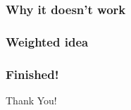 \documentclass{beamer}
\begin{document}
\begin{frame}
  \frametitle{Why it doesn't work}
\end{frame}

\begin{frame}
  \frametitle{Weighted idea}
\end{frame}

\begin{frame}[plain]
\frametitle{Finished!}
  \begin{center}
    \Huge{Thank You!}
  \end{center}
\end{frame}
\end{document}
